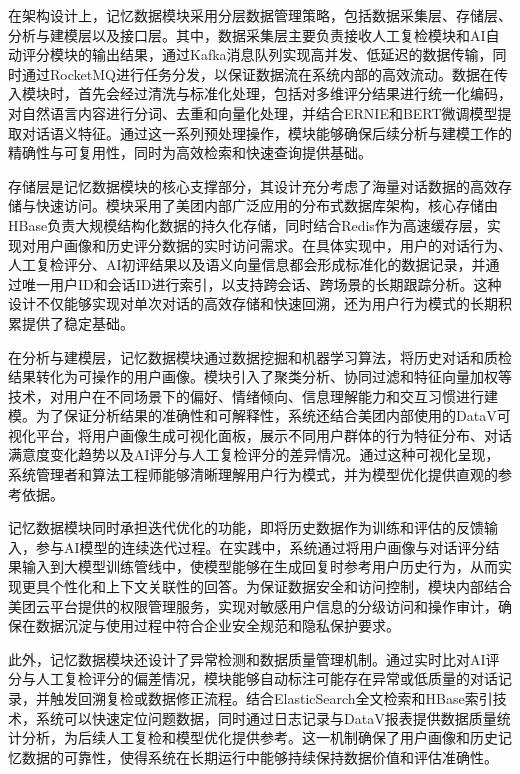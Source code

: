 在架构设计上，记忆数据模块采用分层数据管理策略，包括数据采集层、存储层、分析与建模层以及接口层。其中，数据采集层主要负责接收人工复检模块和AI自动评分模块的输出结果，通过Kafka消息队列实现高并发、低延迟的数据传输，同时通过RocketMQ进行任务分发，以保证数据流在系统内部的高效流动。数据在传入模块时，首先会经过清洗与标准化处理，包括对多维评分结果进行统一化编码，对自然语言内容进行分词、去重和向量化处理，并结合ERNIE和BERT微调模型提取对话语义特征。通过这一系列预处理操作，模块能够确保后续分析与建模工作的精确性与可复用性，同时为高效检索和快速查询提供基础。

存储层是记忆数据模块的核心支撑部分，其设计充分考虑了海量对话数据的高效存储与快速访问。模块采用了美团内部广泛应用的分布式数据库架构，核心存储由HBase负责大规模结构化数据的持久化存储，同时结合Redis作为高速缓存层，实现对用户画像和历史评分数据的实时访问需求。在具体实现中，用户的对话行为、人工复检评分、AI初评结果以及语义向量信息都会形成标准化的数据记录，并通过唯一用户ID和会话ID进行索引，以支持跨会话、跨场景的长期跟踪分析。这种设计不仅能够实现对单次对话的高效存储和快速回溯，还为用户行为模式的长期积累提供了稳定基础。

在分析与建模层，记忆数据模块通过数据挖掘和机器学习算法，将历史对话和质检结果转化为可操作的用户画像。模块引入了聚类分析、协同过滤和特征向量加权等技术，对用户在不同场景下的偏好、情绪倾向、信息理解能力和交互习惯进行建模。为了保证分析结果的准确性和可解释性，系统还结合美团内部使用的DataV可视化平台，将用户画像生成可视化面板，展示不同用户群体的行为特征分布、对话满意度变化趋势以及AI评分与人工复检评分的差异情况。通过这种可视化呈现，系统管理者和算法工程师能够清晰理解用户行为模式，并为模型优化提供直观的参考依据。

记忆数据模块同时承担迭代优化的功能，即将历史数据作为训练和评估的反馈输入，参与AI模型的连续迭代过程。在实践中，系统通过将用户画像与对话评分结果输入到大模型训练管线中，使模型能够在生成回复时参考用户历史行为，从而实现更具个性化和上下文关联性的回答。为保证数据安全和访问控制，模块内部结合美团云平台提供的权限管理服务，实现对敏感用户信息的分级访问和操作审计，确保在数据沉淀与使用过程中符合企业安全规范和隐私保护要求。

此外，记忆数据模块还设计了异常检测和数据质量管理机制。通过实时比对AI评分与人工复检评分的偏差情况，模块能够自动标注可能存在异常或低质量的对话记录，并触发回溯复检或数据修正流程。结合ElasticSearch全文检索和HBase索引技术，系统可以快速定位问题数据，同时通过日志记录与DataV报表提供数据质量统计分析，为后续人工复检和模型优化提供参考。这一机制确保了用户画像和历史记忆数据的可靠性，使得系统在长期运行中能够持续保持数据价值和评估准确性。

